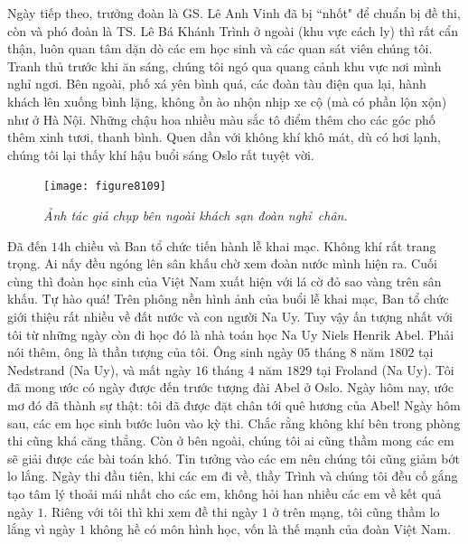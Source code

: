 \begin{multicols}{2}
	\vskip 0.05cm
	Ngày tiếp theo, trưởng đoàn là GS. Lê Anh Vinh đã bị ``nhốt" để chuẩn bị đề thi, còn và phó đoàn là TS. Lê Bá Khánh Trình ở ngoài (khu vực cách ly) thì rất cẩn thận, luôn quan tâm dặn dò các em học sinh và các quan sát viên chúng tôi. Tranh thủ trước khi ăn sáng, chúng tôi ngó qua quang cảnh khu vực nơi mình nghỉ ngơi. Bên ngoài, phố xá yên bình quá, các đoàn tàu điện qua lại, hành khách lên xuống bình lặng, không ồn ào nhộn nhịp xe cộ (mà có phần lộn xộn) như ở Hà Nội. Những chậu hoa nhiều màu sắc tô điểm thêm cho các góc phố thêm xinh tươi, thanh bình. Quen dần với không khí khô mát, dù có hơi lạnh, chúng tôi lại thấy khí hậu buổi sáng Oslo rất tuyệt vời. 
	\begin{figure}[H]
		\vspace*{-5pt}
		\centering
		\captionsetup{labelformat= empty, justification=centering}
		\texttt{[image: figure8109]}
		\caption{\small\textit{\color{cackithi}Ảnh tác giả chụp bên ngoài khách sạn đoàn nghỉ~chân.}}
		\vspace*{-10pt}
	\end{figure}
	Đã đến $14$h chiều và Ban tổ chức tiến hành lễ khai mạc. Không khí rất trang trọng. Ai nấy đều ngóng lên sân khấu chờ xem đoàn nước mình hiện ra. Cuối cùng thì đoàn học sinh của Việt Nam xuất hiện với lá cờ đỏ sao vàng trên sân khấu. Tự hào quá! 
	\vskip 0.05cm
	Trên phông nền hình ảnh của buổi lễ khai mạc, Ban tổ chức giới thiệu rất nhiều về đất nước và con người Na Uy. Tuy vậy ấn tượng nhất với tôi từ những ngày còn đi học đó là nhà toán học Na Uy Niels Henrik Abel. Phải nói thêm, ông là thần tượng của tôi. Ông sinh ngày $05$ tháng $8$ năm $1802$ tại  Nedstrand (Na Uy), và mất ngày $16$ tháng $4$ năm $1829$ tại Froland (Na Uy). Tôi đã mong ước có ngày được đến trước tượng đài Abel ở Oslo. Ngày hôm nay, ước mơ đó đã thành sự thật: tôi đã được đặt chân tới quê hương của Abel! 
	\vskip 0.05cm
	Ngày hôm sau, các em học sinh bước luôn vào kỳ thi. Chắc rằng không khí bên trong phòng thi cũng khá căng thẳng. Còn ở bên ngoài, chúng tôi ai cũng thầm mong các em sẽ giải được các bài toán khó. Tin tưởng vào các em nên chúng tôi cũng giảm bớt lo lắng. 
	\vskip 0.05cm
	Ngày thi đầu tiên, khi các em đi về, thầy Trình và chúng tôi đều cố gắng tạo tâm lý thoải mái nhất cho các em, không hỏi han nhiều các em về kết quả ngày $1$. Riêng với tôi thì khi xem đề thi ngày $1$ ở trên mạng, tôi cũng thầm lo lắng vì ngày $1$ không hề có môn hình học, vốn là thế mạnh của đoàn Việt Nam.
	\vskip 0.05cm

\end{multicols}
